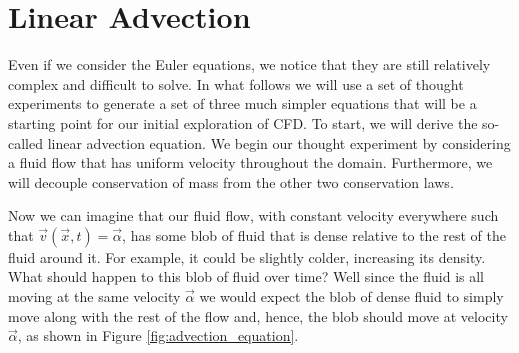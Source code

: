 \section{Linear Advection}
Even if we consider the Euler equations, we notice that they are still relatively complex and difficult to solve. In what follows we will use a set of thought experiments to generate a set of three much simpler equations that will be a starting point for our initial exploration of CFD. To start, we will derive the so-called linear advection equation. We begin our thought experiment by considering a fluid flow that has uniform velocity throughout the domain. Furthermore, we will decouple conservation of mass from the other two conservation laws. 

Now we can imagine that our fluid flow, with constant velocity everywhere such that $\vec{v}(\vec{x},t) = \vec{\alpha}$, has some blob of fluid that is dense relative to the rest of the fluid around it. For example, it could be slightly colder, increasing its density. What should happen to this blob of fluid over time? Well since the fluid is all moving at the same velocity $\vec{\alpha}$ we would expect the blob of dense fluid to simply move along with the rest of the flow and, hence, the blob should move at velocity $\vec{\alpha}$, as shown in Figure \ref{fig:advection_equation}.


